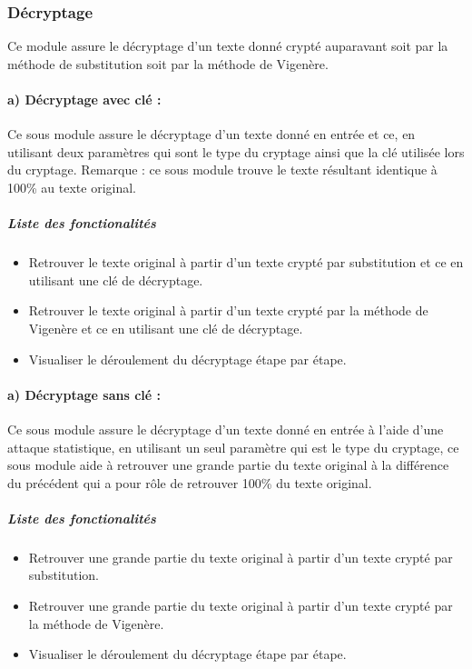 \documentclass[11pt]{article}
\begin{document}
\subsubsection{Décryptage}
Ce module assure le décryptage d’un texte donné crypté auparavant soit par la méthode de substitution soit par la méthode de Vigenère.
\paragraph{a) Décryptage avec clé :}
\newline
Ce sous module assure le décryptage d’un texte donné en entrée et ce, en utilisant deux paramètres qui sont le type du cryptage ainsi que la clé utilisée lors du cryptage.
\newline Remarque : ce sous module trouve le texte résultant identique à 100\% au texte original.
\subparagraph{Liste des fonctionalités}
\begin{itemize}[label=\textbullet]
   \item Retrouver le texte original à partir d’un texte crypté par substitution et ce en utilisant une clé de décryptage.
   \item Retrouver le texte original à partir d’un texte crypté par la méthode de Vigenère et ce en utilisant une clé de décryptage.
   \item Visualiser le déroulement du décryptage étape par étape.
\end{itemize}
\paragraph{a) Décryptage sans clé :}
\newline
 Ce sous module assure le décryptage d’un texte donné en entrée à l'aide d'une attaque statistique, en utilisant un seul paramètre qui est le type du cryptage, ce sous module aide à
retrouver une grande partie du texte original à la différence du précédent qui a pour rôle
de retrouver 100\% du texte original.
\subparagraph{Liste des fonctionalités}
\begin{itemize}[label=\textbullet]
   \item Retrouver une grande partie du texte original à partir d’un texte crypté par substitution.
   \item Retrouver une grande partie du texte original à partir d’un texte crypté par la méthode de Vigenère.
   \item Visualiser le déroulement du décryptage étape par étape.
\end{itemize}
\end{document}
